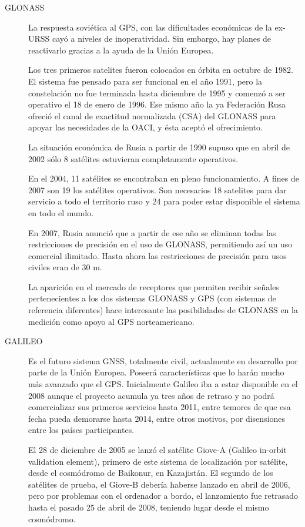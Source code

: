 \documentclass[a4paper,12pt,twoside]{article}
\begin{document}
\begin{description}
    \item [GLONASS] La respuesta sovi\'etica al GPS, con las dificultades econ\'omicas de la ex-URSS cay\'o a niveles de inoperatividad. Sin embargo, hay planes de reactivarlo gracias a la ayuda de la Uni\'on Europea.

Los tres primeros satelites fueron colocados en \'orbita en octubre de 1982. El sistema fue pensado para ser funcional en el a\~no 1991, pero la constelaci\'on no fue terminada hasta diciembre de 1995 y comenz\'o a ser operativo el 18 de enero de 1996. Ese mismo a\~no la ya Federaci\'on Rusa ofreci\'o el canal de exactitud normalizada (CSA) del GLONASS para apoyar las necesidades de la OACI, y \'esta acept\'o el ofrecimiento.

La situaci\'on econ\'omica de Rusia a partir de 1990 supuso que en abril de 2002 s\'olo 8 sat\'elites estuvieran completamente operativos.

En el 2004, 11 sat\'elites se encontraban en pleno funcionamiento. A fines de 2007 son 19 los sat\'elites operativos. Son necesarios 18 satelites para dar servicio a todo el territorio ruso y 24 para poder estar disponible el sistema en todo el mundo.

En 2007, Rusia anunci\'o que a partir de ese a\~no se eliminan todas las restricciones de precisi\'on en el uso de GLONASS, permitiendo as\'i un uso comercial ilimitado. Hasta ahora las restricciones de precisi\'on para usos civiles eran de 30 m.

La aparici\'on en el mercado de receptores que permiten recibir se\~nales pertenecientes a los dos sistemas GLONASS y GPS (con sistemas de referencia diferentes) hace interesante las posibilidades de GLONASS en la medici\'on como apoyo al GPS norteamericano.

    \item [GALILEO] Es el futuro sistema GNSS, totalmente civil, actualmente en desarrollo por parte de la Uni\'on Europea. Poseer\'a caracter\'isticas que lo har\'an mucho m\'as avanzado que el GPS. Inicialmente Galileo iba a estar disponible en el 2008 aunque el proyecto acumula ya tres a\~nos de retraso y no podr\'a comercializar sus primeros servicios hasta 2011, entre temores de que esa fecha pueda demorarse hasta 2014, entre otros motivos, por disensiones entre los pa\'ises participantes.

El 28 de diciembre de 2005 se lanz\'o el sat\'elite Giove-A (Galileo in-orbit validation element), primero de este sistema de localizaci\'on por sat\'elite, desde el cosm\'odromo de Baikonur, en Kazajist\'an. El segundo de los sat\'elites de prueba, el Giove-B deber\'ia haberse lanzado en abril de 2006, pero por problemas con el ordenador a bordo, el lanzamiento fue retrasado hasta el pasado 25 de abril de 2008, teniendo lugar desde el mismo cosm\'odromo.


\end{description}
\end{document}
